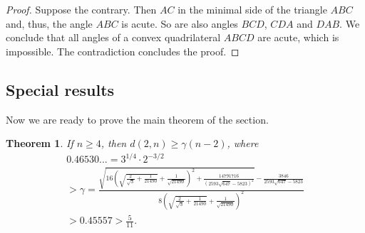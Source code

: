 \documentclass[a4paper,14pt]{article} %
\theoremstyle{plain}
\newtheorem{theorem}{Theorem}[section]
\theoremstyle{definition}
\begin{document}
\begin{proof}
	Suppose the contrary.
	Then $AC$ in the minimal side of the triangle $ABC$ and, thus, the angle $ABC$ is acute.
	So are also angles $BCD$, $CDA$ and $DAB$.
	We conclude that all angles of a convex quadrilateral $ABCD$ are acute, which is impossible.
	The contradiction concludes the proof.
\end{proof}

\subsection{Special results}

Now we are ready to prove the main theorem of the section.

\begin{theorem}
	\label{thm:main_estimate}
	If $n\geq 4$, then $d(2,n) \geq \gamma (n - 2)$,
	where
	\begin{multline}
		0.46530... =
		3^{1/4} \cdot 2^{-3/2}
		\\ >
		\gamma = \frac{\sqrt{16 {{\left( \sqrt{\frac{2}{\sqrt{3}}+\frac{1}{21490}}+\frac{1}{\sqrt{21490}}\right) }^{2}}+\frac{14791716}{{{\left( 2593 \sqrt{647}-5823\right) }^{2}}}}-\frac{3846}{2593 \sqrt{647}-5823}}{8 {{\left( \sqrt{\frac{2}{\sqrt{3}}+\frac{1}{21490}}+\frac{1}{\sqrt{21490}}\right) }^{2}}}
		\\
		> 0.45557
		> \frac{5}{11}
		.
	\end{multline}
\end{theorem}
\end{document}
